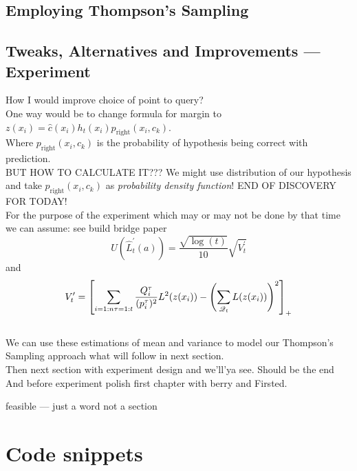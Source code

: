 \documentclass[12pt, a4paper, pdflatex]{report}
\begin{document}


\section{Employing Thompson's Sampling}



\section{Tweaks, Alternatives and Improvements --- Experiment}


\label{sec:qimprove}
How I would improve choice of point to query?\\
One way would be to change formula for margin to $z(x_i) = \hat{c}(x_i)  h_t(x_i) p_{\text{right}}(x_i, c_k)$.\\
Where $p_{\text{right}}(x_i, c_k)$ is the probability of hypothesis being correct with prediction.\\
BUT HOW TO CALCULATE IT???
We might use distribution of our hypothesis and take $p_{\text{right}}(x_i, c_k)$ as \emph{probability density function}!
END OF DISCOVERY FOR TODAY!\\

For the purpose of the experiment which may or may not be done by that time we can assume: see build bridge paper
$$
U(\hat{L}^\prime_t(a)) = \frac{ \sqrt{ \log(t) } }
                       { 10 }
                  \sqrt{ V^\prime_t }
$$
and
$$
V^\prime_t = \left[
  \sum_{i = 1:n \\ \tau = 1:t} \frac{Q^\tau_i}{(p^\tau_i)^2} L^2(z(x_i))
  -
  \left( \sum_{\mathscr{Q}_t} L(z(x_i)) \right)^2
\right]_+
$$~\\


We can use these estimations of mean and variance to model our Thompson's Sampling approach what will follow in next section.\\

Then next section with experiment design and we'll'ya see. Should be the end \\

And before experiment polish first chapter with berry and Firsted.


feasible --- just a word not a section



\appendix
\chapter{Code snippets}
\end{document}
